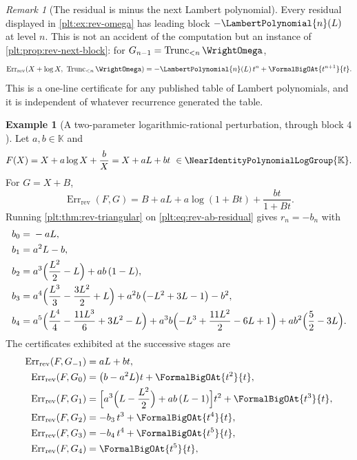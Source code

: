 \documentclass[11pt,oneside]{article}
\theoremstyle{plain}
\theoremstyle{definition}
\newtheorem{example}[theorem]{Example}
\theoremstyle{remark}
\newtheorem{remark}[theorem]{Remark}
\newcommand{\K}{\mathbb{K}}
\newcommand{\Gnear}{\NearIdentityPolynomialLogGroup{\K}} %
\newcommand{\Trunc}[2]{\operatorname{Trunc}_{<#2}#1}     %
\newcommand{\LamP}[1]{\LambertPolynomial{#1}}
\newcommand{\RevErr}[2]{\operatorname{Err}_{\mathrm{rev}}\!\left(#1,#2\right)}
\begin{document}
\begin{remark}[The residual is minus the next Lambert polynomial]
\label{plt:rmk:rev-omega-certificate}
Every residual displayed in \cref{plt:ex:rev-omega} has leading block
\(-\LamP{n}(L)\) at level \(n\).  This is not an accident of the computation
but an instance of \cref{plt:prop:rev-next-block}: for
\(G_{n-1}=\Trunc{\WrightOmega}{n}\),
\[
 \RevErr{X+\log X}{\ \Trunc{\WrightOmega}{n}}
 =-\LamP{n}(L)\,t^{n}+\FormalBigOAt{t^{n+1}}{t}.
\]
This is a one-line certificate for any published table of Lambert polynomials,
and it is independent of whatever recurrence generated the table.
\end{remark}

\begin{example}[A two-parameter logarithmic-rational perturbation, through
block \(4\)]
\label{plt:ex:rev-ab}
Let \(a,b\in\K\) and
\[
 F(X)=X+a\log X+\frac{b}{X}=X+aL+bt\ \in\Gnear .
\]
For \(G=X+B\),
\begin{equation}\label{plt:eq:rev-ab-residual}
 \RevErr{F}{G}=B+aL+a\log(1+Bt)+\frac{bt}{1+Bt}.
\end{equation}
Running \cref{plt:thm:rev-triangular} on
\eqref{plt:eq:rev-ab-residual} gives \(r_n=-b_n\) with
\begin{align}
 b_0={}&-aL,\label{plt:eq:rev-ab-b0}\\
 b_1={}&a^2L-b,\label{plt:eq:rev-ab-b1}\\
 b_2={}&a^3\Bigl(\frac{L^2}2-L\Bigr)+ab\,(1-L),\label{plt:eq:rev-ab-b2}\\
 b_3={}&a^4\Bigl(\frac{L^3}3-\frac{3L^2}2+L\Bigr)
        +a^2b\,\bigl(-L^2+3L-1\bigr)-b^2,\label{plt:eq:rev-ab-b3}\\
 b_4={}&a^5\Bigl(\frac{L^4}4-\frac{11L^3}6+3L^2-L\Bigr)
        +a^3b\Bigl(-L^3+\frac{11L^2}2-6L+1\Bigr)
        +ab^2\Bigl(\frac52-3L\Bigr).\label{plt:eq:rev-ab-b4}
\end{align}
The certificates exhibited at the successive stages are
\begin{align*}
 \RevErr{F}{G_{-1}}&=aL+bt,\\
 \RevErr{F}{G_{0}}&=\bigl(b-a^2L\bigr)t+\FormalBigOAt{t^{2}}{t},\\
 \RevErr{F}{G_{1}}&=\Bigl[a^3\Bigl(L-\frac{L^2}2\Bigr)+ab\,(L-1)\Bigr]t^2
   +\FormalBigOAt{t^{3}}{t},\\
 \RevErr{F}{G_{2}}&=-b_3\,t^3+\FormalBigOAt{t^{4}}{t},\\
 \RevErr{F}{G_{3}}&=-b_4\,t^4+\FormalBigOAt{t^{5}}{t},\\
 \RevErr{F}{G_{4}}&=\FormalBigOAt{t^{5}}{t},

\end{align*}
\end{example}
\end{document}
